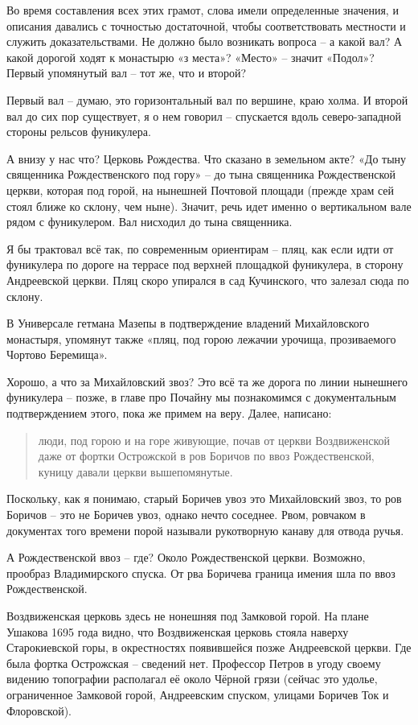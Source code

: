 Во время составления всех этих грамот, слова имели определенные значения, и описания давались с точностью достаточной, чтобы соответствовать местности и служить доказательствами. Не должно было возникать вопроса – а какой вал? А какой дорогой ходят к монастырю «з места»? «Место» – значит «Подол»? Первый упомянутый вал – тот же, что и второй?

Первый вал – думаю, это горизонтальный вал по вершине, краю холма. И второй вал до сих пор существует, я о нем говорил – спускается вдоль северо-западной стороны рельсов фуникулера. 

А внизу у нас что? Церковь Рождества. Что сказано в земельном акте? «До тыну священника Рождественского под гору» – до тына священника Рождественской церкви, которая под горой, на нынешней Почтовой площади (прежде храм сей стоял ближе ко склону, чем ныне). Значит, речь идет именно о вертикальном вале рядом с фуникулером. Вал нисходил до тына священника.

Я бы трактовал всё так, по современным ориентирам – пляц, как если идти от фуникулера по дороге на террасе под верхней площадкой фуникулера, в сторону Андреевской церкви. Пляц скоро упирался в сад Кучинского, что залезал сюда по склону.

В Универсале гетмана Мазепы в подтверждение владений Михайловского монастыря, упомянут также «пляц, под горою лежачии урочища, прозиваемого Чортово Беремища».

Хорошо, а что за Михайловский звоз? Это всё та же дорога по линии нынешнего фуникулера – позже, в главе про Почайну мы познакомимся с документальным подтверждением этого, пока же примем на веру. Далее, написано: 

\begin{quotation}
люди, под горою и на горе живующие, почав от церкви Воздвиженской даже от фортки Острожской в ров Боричов по ввоз Рождественской, куницу давали церкви вышепомянутые.
\end{quotation}

Поскольку, как я понимаю, старый Боричев увоз это Михайловский звоз, то ров Боричов – это не Боричев увоз, однако нечто соседнее. Рвом, ровчаком в документах того времени порой называли рукотворную канаву для отвода ручья. 

А Рождественской ввоз – где? Около Рождественской церкви. Возможно, прообраз Владимирского спуска. От рва Боричева граница имения шла по ввоз Рождественской.

Воздвиженская церковь здесь не нонешняя под Замковой горой. На плане Ушакова 1695 года видно, что Воздвиженская церковь стояла наверху Старокиевской горы, в окрестностях появившейся позже Андреевской церкви. Где была фортка Острожская – сведений нет. Профессор Петров в угоду своему видению топографии располагал её около Чёрной грязи (сейчас это удолье, ограниченное Замковой горой, Андреевским спуском, улицами Боричев Ток и Флоровской).

